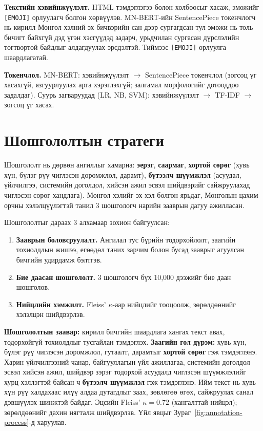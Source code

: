 \textbf{Текстийн хэвийнжүүлэлт.} HTML тэмдэглэгээ болон холбоосыг хасаж,
эможийг \texttt{[EMOJI]} орлуулагч болгон хөрвүүлэв. MN-BERT-ийн SentencePiece
токенчлогч нь кирилл Монгол хэлний эх бичвэрийн сан дээр сургагдсан тул эможи
нь толь бичигт байхгүй дэд үгэн хэсгүүдэд задарч, урьдчилан сургасан
дүрслэлийн тогтвортой байдлыг алдагдуулах эрсдэлтэй. Тиймээс
\texttt{[EMOJI]} орлуулга шаардлагатай.

\textbf{Токенчлол.} MN-BERT: хэвийнжүүлэлт $\to$ SentencePiece токенчлол
(зогсоц үг хасахгүй, язгуурлуулах арга хэрэглэхгүй; залгамал морфологийг
дотооддоо задалдаг).
Суурь загваруудад (LR, NB, SVM): хэвийнжүүлэлт $\to$ TF-IDF $\to$ зогсоц үг хасах.

\section{Шошгололтын стратеги}

Шошгололт нь дөрвөн ангиллыг хамарна: \textbf{эерэг}, \textbf{саармаг},
\textbf{хортой сөрөг} (хувь хүн, бүлэг рүү чиглэсэн доромжлол, дарамт),
\textbf{бүтээлч шүүмжлэл} (асуудал, үйлчилгээ, системийн доголдол, хийсэн ажил
эсвэл шийдвэрийг сайжруулахад чиглэсэн сөрөг хандлага).
Монгол хэлийг эх хэл болгон ярьдаг, Монголын цахим орчны хэлэлцүүлэгтэй танил
3 шошгологч нарийн зааврын дагуу ажилласан.

Шошгололтыг дараах 3 алхамаар зохион байгуулсан:

\begin{enumerate}
  \item \textbf{Зааврын боловсруулалт.} Ангилал тус бүрийн тодорхойлолт, заагийн
    тохиолдлын жишээ, егөөдөл таних зарчим болон бусад зааврыг агуулсан бичгийн удирдамж бэлтгэв.
  \item \textbf{Бие даасан шошгололт.} 3 шошгологч бүх 10,000 дээжийг бие даан шошголов.
  \item \textbf{Нийцлийн хэмжилт.} Fleiss' $\kappa$-аар нийцлийг тооцоолж, зөрөлдөөнийг хэлэлцэн шийдвэрлэв.
\end{enumerate}

\textbf{Шошгололтын заавар:} кирилл бичгийн шаардлага хангах текст авах,
тодорхойгүй тохиолдлыг тусгайлан тэмдэглэх. \textbf{Заагийн гол дүрэм:} хувь хүн, бүлэг рүү чиглэсэн
доромжлол, гутаалт, дарамтыг \textbf{хортой сөрөг} гэж тэмдэглэнэ. Харин
үйлчилгээний чанар, байгууллагын үйл ажиллагаа, системийн доголдол эсвэл хийсэн
ажил, шийдвэр зэрэг тодорхой асуудалд чиглэсэн шүүмжлэлийг хурц хэллэгтэй
байсан ч \textbf{бүтээлч шүүмжлэл} гэж тэмдэглэнэ. Ийм текст нь хувь хүн рүү
халдахаас илүү алдаа дутагдлыг заах, зөвлөгөө өгөх, сайжруулах санал дэвшүүлэх
шинжтэй байдаг. Эцсийн Fleiss' $\kappa{=}0.72$ (хангалттай нийцэл);
зөрөлдөөнийг дахин нягталж шийдвэрлэв. Үйл явцыг
Зураг~\ref{fig:annotation-process}-д харуулав.

